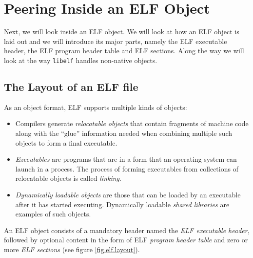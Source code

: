 \documentclass[a4paper,pdftex]{book}
\newcommand{\firstterm}[1]{\textit{#1}}
\newcommand{\library}[1]{\texttt{#1}}
\begin{document}
\chapter{Peering Inside an ELF Object}\label{chap.peering-inside}

Next, we will look inside an ELF object.  We will look at how an ELF
object is laid out and we will introduce its major parts, namely the
ELF executable header, the ELF program header table and ELF sections.
Along the way we will look at the way \library{libelf} handles
non-native objects.

\section{The Layout of an ELF file}

As an object format, ELF supports multiple kinds of objects:

\begin{itemize}
\item Compilers generate \firstterm{relocatable
  objects} that contain fragments of
  machine code along with the ``glue'' information needed when
  combining multiple such objects to form a final executable.
\item \firstterm{Executables} are programs that are
  in a form that an operating system can launch in a process.  The
  process of forming executables from collections of relocatable
  objects is called \firstterm{linking}.
\item \firstterm{Dynamically loadable objects} are those that can be loaded by an executable
  after it has started executing.  Dynamically loadable
  \firstterm{shared libraries} are examples of
  such objects.
\end{itemize}

An ELF object consists of a mandatory header named the \firstterm{ELF
  executable header}, followed by optional
content in the form of ELF \firstterm{program header table}
 and zero or more \firstterm{ELF
  sections} (see figure \vref{fig.elf.layout}).
\end{document}
